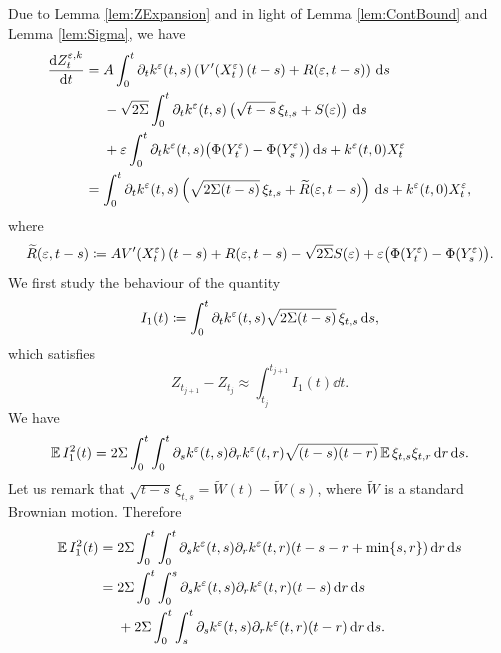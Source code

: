 \documentclass[10pt]{article}
\begin{document}
Due to Lemma \ref{lem:ZExpansion} and in light of Lemma \ref{lem:ContBound} and Lemma \ref{lem:Sigma}, we have
\begin{equation}
\begin{aligned}
	\frac{\mathrm{d} Z^{\varepsilon,k}_t}{\mathrm{d} t} &= 
	\begin{aligned}[t] 
	&A \int_0^t \partial_t k^\varepsilon(t, s) \left( V'(X^\varepsilon_t)\,(t-s) + R(\varepsilon, t-s)\right) \,\mathrm{d} s  \\
	&-\sqrt{2\Sigma} \int_0^t \partial_t k^\varepsilon(t, s) \left( \sqrt{t-s} \, \xi_{t,s} + S(\varepsilon) \right)\,\mathrm{d} s\\
	&+ \varepsilon \int_0^t \partial_t k^\varepsilon(t, s) \big(\Phi(Y^\varepsilon_t)- \Phi(Y^\varepsilon_s)\big) \,\mathrm{d} s + k^\varepsilon(t, 0) X^\varepsilon_t
	\end{aligned}
	\\
	&= \int_0^t \partial_t k^\varepsilon(t, s)\left(\sqrt{2\Sigma(t-s)} \, \xi_{t,s} + \widetilde R(\varepsilon, t - s)\right) \,\mathrm{d} s + k^\varepsilon(t, 0) X^\varepsilon_t,
\end{aligned}
\end{equation}
where
\begin{equation}
	\widetilde R(\varepsilon, t - s) \coloneqq AV'(X^\varepsilon_t)\,(t-s) + R(\varepsilon, t-s) - \sqrt{2\Sigma} S(\varepsilon) + \varepsilon \big(\Phi(Y^\varepsilon_t)- \Phi(Y^\varepsilon_s)\big).
\end{equation}
We first study the behaviour of the quantity
\begin{equation}
	I_1(t) \coloneqq \int_0^t \partial_t k^\varepsilon(t, s) \sqrt{2\Sigma(t-s)} \, \xi_{t,s} \,\mathrm{d} s,
\end{equation}
which satisfies
\begin{equation}
	Z_{t_{j+1}} - Z_{t_j} \approx \int_{t_j}^{t_{j+1}} I_1(t) \dd t.	
\end{equation}
We have
\begin{equation}
	\operatorname{\mathbb{E}} I_1^2(t) = 2 \Sigma \int_0^t \int_0^t \partial_s k^\varepsilon(t, s) \partial_r k^\varepsilon(t, r) \sqrt{(t- s)(t-r)} \operatorname{\mathbb{E}} \xi_{t,s}\xi_{t,r} \,\mathrm{d} r \,\mathrm{d} s.
\end{equation}
Let us remark that $\sqrt{t-s}\, \xi_{t,s} = \widetilde W(t) - \widetilde W(s)$, where $\widetilde W$ is a standard Brownian motion. Therefore 
\begin{equation}
\begin{aligned}
	\operatorname{\mathbb{E}} I_1^2(t) &= 2\Sigma \int_0^t \int_0^t \partial_s k^\varepsilon(t, s) \partial_r k^\varepsilon(t, r) (t-s-r+\min\{s,r\}) \,\mathrm{d} r \,\mathrm{d} s \\
	&= 
	\begin{aligned}[t]
	& 2\Sigma \int_0^t \int_0^s \partial_s k^\varepsilon(t, s) \partial_r k^\varepsilon(t, r) (t-s) \,\mathrm{d} r \,\mathrm{d} s \\
	&+ 2\Sigma \int_0^t \int_s^t \partial_s k^\varepsilon(t, s) \partial_r k^\varepsilon(t, r) (t-r) \,\mathrm{d} r \,\mathrm{d} s.
	\end{aligned}
\end{aligned}
\end{equation}
\end{document}
